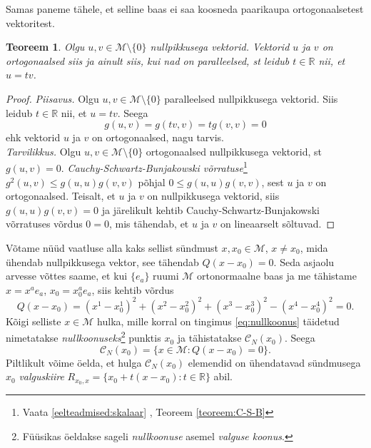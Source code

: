 \documentclass[a4paper,12pt]{article}
\theoremstyle{plain}
\newtheorem{teoreem}{Teoreem}[section]
\theoremstyle{definition}
\numberwithin{equation}{section}
\begin{document}
Samas paneme tähele, et selline baas ei saa koosneda paarikaupa ortogonaalsetest vektoritest.
\begin{teoreem}
Olgu $u, v \in \mathcal{M} \setminus \{0\}$ nullpikkusega vektorid. Vektorid $u$ ja $v$ on ortogonaalsed siis ja ainult siis, kui nad on paralleelsed, st leidub $t \in \mathbb{R}$ nii, et $u = tv$.
\end{teoreem}
\begin{proof}
\emph{Piisavus.} Olgu $u, v \in \mathcal{M} \setminus \{0\}$ paralleelsed nullpikkusega vektorid. Siis leidub $t \in \mathbb{R}$ nii, et $u = tv$. Seega
\[g\left(u, v\right) = g \left(tv, v\right) = t g \left(v, v\right) = 0\]
ehk vektorid $u$ ja $v$ on ortogonaalsed, nagu tarvis.
\\
\emph{Tarvilikkus.} Olgu $u, v \in \mathcal{M} \setminus \{0\}$ ortogonaalsed nullpikkusega vektorid, st $g \left(u, v\right) = 0$. \emph{Cauchy-Schwartz-Bunjakowski võrratuse}\footnote{Vaata \ref{eelteadmised:skalaar} , Teoreem \ref{teoreem:C-S-B}} $g^2 \left(u, v \right) \leq g \left(u, u \right) g \left(v, v \right)$ põhjal $0 \leq g \left(u, u \right) g \left(v, v \right)$, sest $u$ ja $v$ on ortogonaalsed. Teisalt, et $u$ ja $v$ on nullpikkusega vektorid, siis $g \left(u, u \right) g \left(v, v \right) = 0$ ja järelikult kehtib Cauchy-Schwartz-Bunjakowski võrratuses võrdus $0 = 0$, mis tähendab, et $u$ ja $v$ on lineaarselt sõltuvad.
\end{proof}

Võtame nüüd vaatluse alla kaks sellist sündmust $x, x_0 \in \mathcal{M}$, $x \neq x_0$, mida ühendab nullpikkusega vektor, see tähendab $Q \left(x- x_0\right) = 0$. Seda asjaolu arvesse võttes saame, et kui $\{e_a\}$ ruumi $\mathcal{M}$ ortonormaalne baas ja me tähistame $x = x^a e_a$, $x_0 = x_0^a e_a$, siis kehtib võrdus
\begin{equation} \label{eq:nullkoonus}
Q \left(x - x_0\right) = \left(x^1 - x_0^1\right)^2 + \left(x^2 - x_0^2\right)^2 + \left(x^3 - x_0^3\right)^2 - \left(x^4 - x_0^4\right)^2 = 0.
\end{equation}
Kõigi selliste $x \in \mathcal{M}$ hulka, mille korral on tingimus \ref{eq:nullkoonus} täidetud nimetatakse \emph{nullkoonuseks}\footnote{Füüsikas öeldakse sageli \emph{nullkoonuse} asemel \emph{valguse koonus}.} punktis $x_0$ ja tähistatakse $\mathcal{C}_N\left(x_0\right)$. Seega 
\[\mathcal{C}_N\left(x_0\right) = \{x \in \mathcal{M} : Q \left(x- x_0\right) = 0 \}.\]
Piltlikult võime öelda, et hulga $\mathcal{C}_N\left(x_0\right)$ elemendid on ühendatavad sündmusega $x_0$ \emph{valguskiire} $R_{x_0, x} = \{x_0 + t\left(x - x_0\right) : t \in \mathbb{R} \}$ abil.
\end{document}

